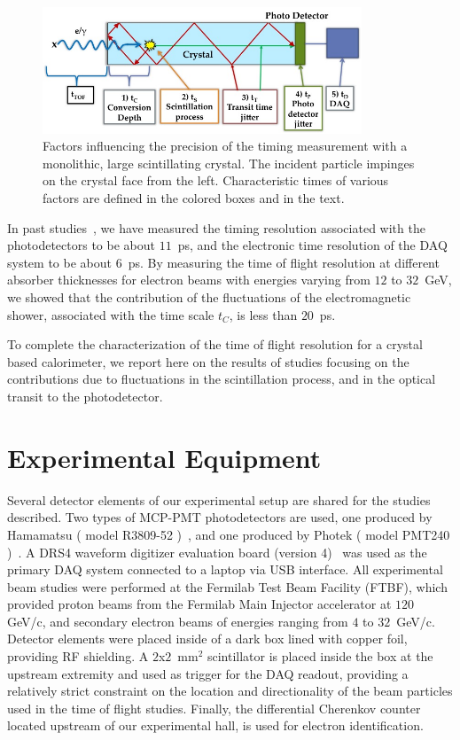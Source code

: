 \documentclass[12pt]{article}
\begin{document}
\begin{figure}[h] \centering
\includegraphics[width=0.85\textwidth]{figs/ScintillatorTiming} \caption{Factors
influencing the precision of the timing measurement with a monolithic, large
scintillating crystal. The incident particle impinges on the crystal face from
the left. Characteristic times of various factors are defined in the colored
boxes and in the text.}
\label{fig:ScintillatorTiming}
\end{figure}

In past studies~\cite{MCPFastCaloNIMA}, we have measured the timing resolution
associated with the photodetectors to be
about $11$~ps, and the electronic time resolution
of the DAQ system to be about $6$~ps. By measuring the time of flight
resolution at different absorber thicknesses for electron beams with
energies varying from $12$ to $32$~GeV, we showed that the contribution
of the fluctuations of the electromagnetic shower, associated with
the time scale $t_{C}$, is less than $20$~ps. 

To complete the characterization of the time of flight resolution
for a crystal based calorimeter, we report here on the results
of studies focusing on the contributions due to fluctuations
in the scintillation process, and in the optical transit
to the photodetector.



\section{Experimental Equipment}

Several detector elements of our experimental setup are shared for 
the studies described. Two types of MCP-PMT photodetectors 
are used, one produced by Hamamatsu 
( model R3809-52 )~\cite{HamamatsuMCPPMT}, and one
produced by Photek ( model PMT240 )~\cite{Photek240}. 
A DRS4 waveform digitizer evaluation board (version 4)~\cite{DRS4} was
used as the primary DAQ system connected to a laptop via
USB interface. All experimental beam studies were performed
at the Fermilab Test Beam Facility (FTBF), which 
provided proton beams from the Fermilab Main Injector accelerator
at $120$ GeV/c, and secondary electron beams of energies ranging 
from $4$ to $32$~GeV/c. Detector elements were placed inside of a 
dark box lined with copper foil, providing RF shielding. A
$2$x$2$~$\mathrm{mm}^{2}$ scintillator is placed inside the box at
the upstream extremity and used as trigger for the DAQ readout,
providing a relatively strict constraint on the location and directionality
of the beam particles used in the time of flight studies. 
Finally, the differential Cherenkov counter located upstream
of our experimental hall, is used for electron identification. 
\end{document}
